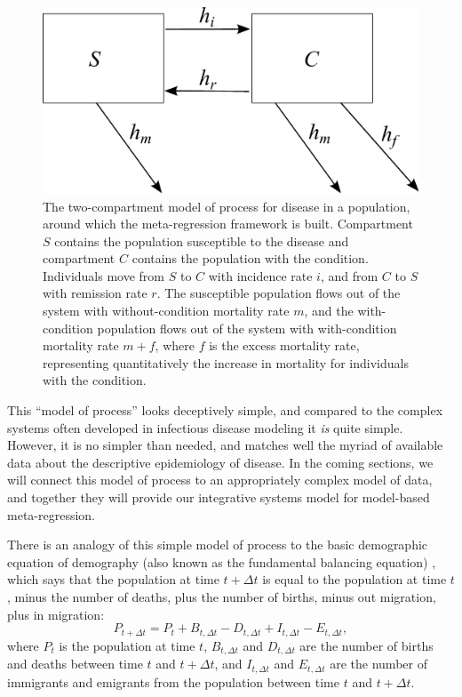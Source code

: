 \begin{figure}[h]
\begin{center}
\includegraphics[width=5in]{SC.pdf}
\caption{The two-compartment model of process for disease in a population, around which the meta-regression framework is built. Compartment $S$ contains the population susceptible to the disease and compartment $C$ contains the population with the condition. Individuals move from $S$ to $C$ with incidence rate $i$, and from $C$ to $S$ with remission rate $r$. The susceptible population flows out of the system with without-condition mortality rate $m$, and the with-condition population flows out of the system with with-condition mortality rate $m+f$, where $f$ is the excess mortality rate, representing quantitatively the increase in mortality for individuals with the condition.}
\label{forward-sim-two-compartment}
\end{center}
\end{figure}


This ``model of process'' looks deceptively simple, and compared to the complex systems often developed in infectious disease modeling it \emph{is} quite simple.  However, it is no simpler than needed, and matches well the myriad of available data about the descriptive epidemiology of disease.  In the coming sections, we will connect this model of process to an appropriately complex model of data, and together they will provide our integrative systems model for model-based meta-regression.

There is an analogy of this simple model of process to the basic demographic equation of demography (also known as the fundamental balancing equation) \cite{TK book on demography}, which says that the population at time $t+\Delta t$ is equal to the population at time $t$, minus the number of deaths, plus the number of births, minus out migration, plus in migration:
\[P_{t+\Delta t} = P_t + B_{t, \Delta t} - D_{t, \Delta t} +
 I_{t, \Delta t} - E_{t, \Delta t},
\]
where $P_t$ is the population at time $t$, $B_{t, \Delta t}$ and $D_{t, \Delta t}$ are the number of births and deaths between time $t$ and $t+\Delta t$, and $I_{t, \Delta t}$ and $E_{t, \Delta t}$ are the number of immigrants and emigrants from the population between time $t$ and $t+\Delta t$.

